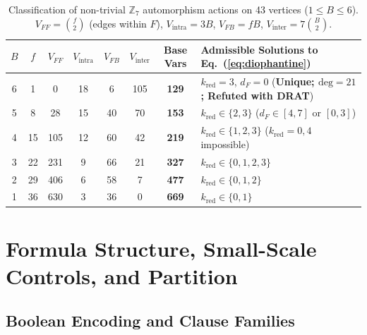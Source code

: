 \documentclass[11pt,a4paper]{article}
\theoremstyle{definition}
\begin{document}
\begin{table}[h!]
\centering
\small
\begin{tabular}{cccccccp{5.5cm}}
\toprule
$B$ & $f$ & $V_{FF}$ & $V_{\text{intra}}$ & $V_{FB}$ & $V_{\text{inter}}$ & \textbf{Base Vars} & \textbf{Admissible Solutions to Eq.~(\ref{eq:diophantine})} \\
\midrule
6 & 1  & 0   & 18 & 6  & 105 & \textbf{129} & $k_{\text{red}}=3$, $d_F=0$ (\textbf{Unique; $\text{deg}=21$; Refuted with DRAT}) \\
5 & 8  & 28  & 15 & 40 & 70  & \textbf{153} & $k_{\text{red}} \in \{2, 3\}$ ($d_F \in [4,7]$ or $[0,3]$) \\
4 & 15 & 105 & 12 & 60 & 42  & \textbf{219} & $k_{\text{red}} \in \{1, 2, 3\}$ ($k_{\text{red}}=0, 4$ impossible) \\
3 & 22 & 231 & 9  & 66 & 21  & \textbf{327} & $k_{\text{red}} \in \{0, 1, 2, 3\}$ \\
2 & 29 & 406 & 6  & 58 & 7   & \textbf{477} & $k_{\text{red}} \in \{0, 1, 2\}$ \\
1 & 36 & 630 & 3  & 36 & 0   & \textbf{669} & $k_{\text{red}} \in \{0, 1\}$ \\
\bottomrule
\end{tabular}
\caption{Classification of non-trivial $\mathbb{Z}_7$ automorphism actions on 43 vertices ($1 \le B \le 6$). $V_{FF} = \binom{f}{2}$ (edges within $F$), $V_{\text{intra}} = 3B$, $V_{FB} = fB$, $V_{\text{inter}} = 7\binom{B}{2}$.}
\label{tab:fixed_points}
\end{table}

\section{Formula Structure, Small-Scale Controls, and Partition}

\subsection{Boolean Encoding and Clause Families}
\end{document}
